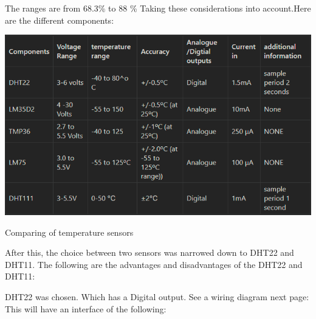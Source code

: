 The ranges are from 68.3\% to 88 \% Taking these considerations into account.Here are the different components:

\begin{table}[h!]
	\centering
	\includegraphics[width=0.5\linewidth]{Images/tempssenorscompared.png}
	\caption{Comparing of temperature sensors}
	\label{Comparing of temperature sensors}
\end{table}
After this, the choice between two sensors was narrowed down to DHT22 and DHT11. The  following are the advantages and disadvantages of the DHT22 and DHT11:
\begin{table}[h!]
	\centering
	\caption{Comparing DHT22 and DHT11}
	\label{Compareing DHT22 and DHT11}

\end{table}

 DHT22 was chosen. Which has a  Digital output. See a wiring diagram next page:
 \newpage
This will have an interface of the following:


